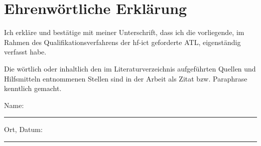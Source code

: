 

\section{Ehrenwörtliche Erkl\"arung}

Ich erkläre und bestätige mit meiner Unterschrift, dass ich die vorliegende, im Rahmen 
des Qualifikationsverfahrens der hf-ict geforderte ATL, eigenständig verfasst
habe.

Die wörtlich oder inhaltlich den im Literaturverzeichnis aufgeführten Quellen und 
Hilfsmitteln entnommenen Stellen sind in der Arbeit als Zitat bzw. Paraphrase 
kenntlich gemacht.

\vspace{1cm}

\noindent Name:\\
\rule[0.5em]{30em}{0.5pt}                   %
 
\noindent Ort, Datum:\\
\rule[0.5em]{30em}{0.5pt}                   %